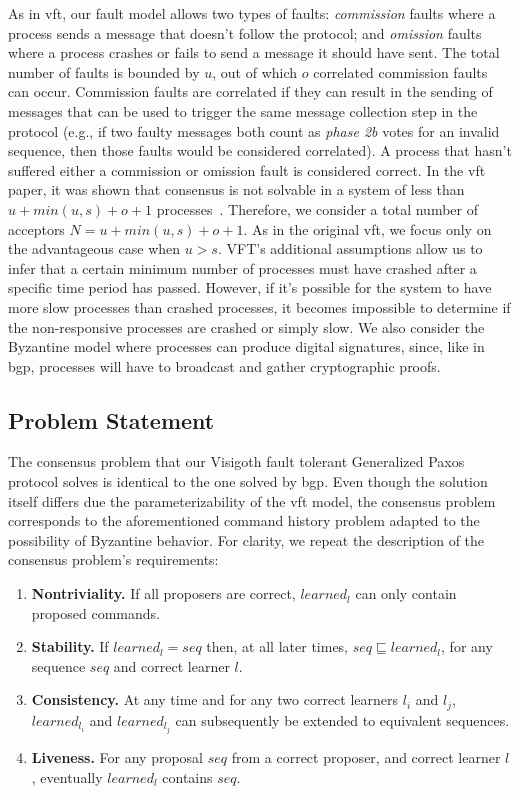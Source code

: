 As in \acrshort{vft}, our fault model allows two types of faults: \textit{commission} faults where a process sends a message that doesn't follow the protocol; and \textit{omission} faults where a process crashes or fails to send a message it should have sent. The total number of faults is bounded by $u$, out of which $o$ correlated commission faults can occur. Commission faults are correlated if they can result in the sending of messages that can be used to trigger the same message collection step in the protocol (e.g., if two faulty messages both count as \textit{phase 2b} votes for an invalid sequence, then those faults would be considered correlated). A process that hasn't suffered either a commission or omission fault is considered correct. In the \acrshort{vft} paper, it was shown that consensus is not solvable in a system of less than $u+min(u,s)+o+1$ processes~\cite{Porto2015}. Therefore, we consider a total number of acceptors $N = u + min(u,s)+o+1$. As in the original \acrshort{vft}, we focus only on the advantageous case when $u>s$. VFT's additional assumptions allow us to infer that a certain minimum number of processes must have crashed after a specific time period has passed. However, if it's possible for the system to have more slow processes than crashed processes, it becomes impossible to determine if the non-responsive processes are crashed or simply slow.	We also consider the Byzantine model where processes can produce digital signatures, since, like in \acrshort{bgp}, processes will have to broadcast and gather cryptographic proofs.

\subsection{Problem Statement}
The consensus problem that our Visigoth fault tolerant Generalized Paxos protocol solves is identical to the one solved by \acrshort{bgp}. Even though the solution itself differs due the parameterizability of the \acrshort{vft} model, the consensus problem corresponds to the aforementioned command history problem adapted to the possibility of Byzantine behavior. For clarity, we repeat the description of the consensus problem's requirements:

\begin{enumerate}
	\item \textbf{Nontriviality.} If all proposers are correct, $learned_l$ can only contain proposed commands.
	\item \textbf{Stability.} If $learned_l = seq$ then, at all later times, $seq \sqsubseteq learned_l$, for any sequence $seq$ and correct learner $l$.
	\item \textbf{Consistency.} At any time and for any two correct learners $l_i$ and $l_j$, $learned_{l_i}$ and $learned_{l_j}$ can subsequently be extended to equivalent sequences.
	\item \textbf{Liveness.} For any proposal $seq$ from a correct proposer, and correct learner $l$, eventually $learned_l$ contains $seq$.
\end{enumerate}